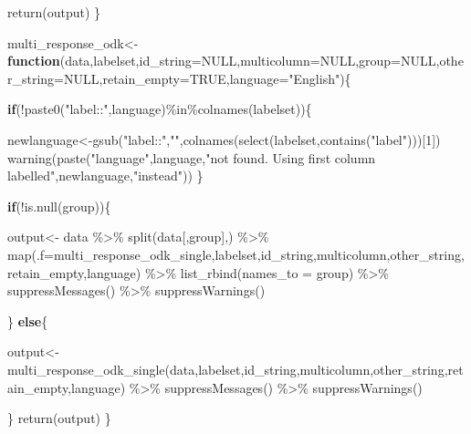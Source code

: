 \documentclass[
  letterpaper,
  DIV=11,
  numbers=noendperiod]{scrreprt}
\newenvironment{Shaded}{\begin{snugshade}}{\end{snugshade}}
\newcommand{\AttributeTok}[1]{\textcolor[rgb]{0.40,0.45,0.13}{#1}}
\newcommand{\ConstantTok}[1]{\textcolor[rgb]{0.56,0.35,0.01}{#1}}
\newcommand{\ControlFlowTok}[1]{\textcolor[rgb]{0.00,0.23,0.31}{\textbf{#1}}}
\newcommand{\DecValTok}[1]{\textcolor[rgb]{0.68,0.00,0.00}{#1}}
\newcommand{\FunctionTok}[1]{\textcolor[rgb]{0.28,0.35,0.67}{#1}}
\newcommand{\NormalTok}[1]{\textcolor[rgb]{0.00,0.23,0.31}{#1}}
\newcommand{\OtherTok}[1]{\textcolor[rgb]{0.00,0.23,0.31}{#1}}
\newcommand{\SpecialCharTok}[1]{\textcolor[rgb]{0.37,0.37,0.37}{#1}}
\newcommand{\StringTok}[1]{\textcolor[rgb]{0.13,0.47,0.30}{#1}}
\begin{document}
\begin{Shaded}
\begin{Highlighting}[]
  
  
  \FunctionTok{return}\NormalTok{(output)}
\NormalTok{\}}

\NormalTok{multi\_response\_odk}\OtherTok{\textless{}{-}}\ControlFlowTok{function}\NormalTok{(data,labelset,}\AttributeTok{id\_string=}\ConstantTok{NULL}\NormalTok{,}\AttributeTok{multicolumn=}\ConstantTok{NULL}\NormalTok{,}\AttributeTok{group=}\ConstantTok{NULL}\NormalTok{,}\AttributeTok{other\_string=}\ConstantTok{NULL}\NormalTok{,}\AttributeTok{retain\_empty=}\ConstantTok{TRUE}\NormalTok{,}\AttributeTok{language=}\StringTok{"English"}\NormalTok{)\{}
  
  \ControlFlowTok{if}\NormalTok{(}\SpecialCharTok{!}\FunctionTok{paste0}\NormalTok{(}\StringTok{"label::"}\NormalTok{,language)}\SpecialCharTok{\%in\%}\FunctionTok{colnames}\NormalTok{(labelset))\{}
    
\NormalTok{    newlanguage}\OtherTok{\textless{}{-}}\FunctionTok{gsub}\NormalTok{(}\StringTok{"label::"}\NormalTok{,}\StringTok{""}\NormalTok{,}\FunctionTok{colnames}\NormalTok{(}\FunctionTok{select}\NormalTok{(labelset,}\FunctionTok{contains}\NormalTok{(}\StringTok{"label"}\NormalTok{)))[}\DecValTok{1}\NormalTok{])}
    \FunctionTok{warning}\NormalTok{(}\FunctionTok{paste}\NormalTok{(}\StringTok{"language"}\NormalTok{,language,}\StringTok{"not found. Using first column labelled"}\NormalTok{,newlanguage,}\StringTok{"instead"}\NormalTok{))}
\NormalTok{  \}}
  
  \ControlFlowTok{if}\NormalTok{(}\SpecialCharTok{!}\FunctionTok{is.null}\NormalTok{(group))\{}
    
\NormalTok{    output}\OtherTok{\textless{}{-}}\NormalTok{   data }\SpecialCharTok{\%\textgreater{}\%}
      \FunctionTok{split}\NormalTok{(data[,group],) }\SpecialCharTok{\%\textgreater{}\%}
      \FunctionTok{map}\NormalTok{(}\AttributeTok{.f=}\NormalTok{multi\_response\_odk\_single,labelset,id\_string,multicolumn,other\_string,retain\_empty,language) }\SpecialCharTok{\%\textgreater{}\%}
      \FunctionTok{list\_rbind}\NormalTok{(}\AttributeTok{names\_to =}\NormalTok{ group) }\SpecialCharTok{\%\textgreater{}\%}
      \FunctionTok{suppressMessages}\NormalTok{() }\SpecialCharTok{\%\textgreater{}\%} \FunctionTok{suppressWarnings}\NormalTok{()}
    
    
\NormalTok{  \}}
  \ControlFlowTok{else}\NormalTok{\{}
    
\NormalTok{    output}\OtherTok{\textless{}{-}} \FunctionTok{multi\_response\_odk\_single}\NormalTok{(data,labelset,id\_string,multicolumn,other\_string,retain\_empty,language) }\SpecialCharTok{\%\textgreater{}\%}
      \FunctionTok{suppressMessages}\NormalTok{() }\SpecialCharTok{\%\textgreater{}\%} \FunctionTok{suppressWarnings}\NormalTok{()}
    
\NormalTok{  \}}
  \FunctionTok{return}\NormalTok{(output)}
\NormalTok{\}}
\end{Highlighting}
\end{Shaded}
\end{document}
